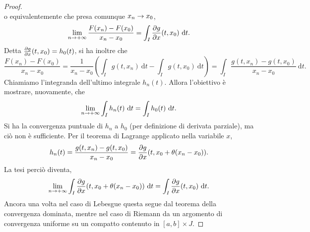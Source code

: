 \documentclass[Completo.tex]{subfiles}
\begin{document}
\begin{proof}
\begin{equation*}
\end{equation*}
o equivalentemente che presa comunque $x_n \rightarrow x_0$,
\begin{equation*}
\lim_{n \ra +\infty} \frac{F(x_n) - F(x_0)}{x_n-x_0} = \int_I \frac{\pd g}{\pd x}(t, x_0) \ \mathrm{d}t.
\end{equation*}
Detta $\frac{\partial g}{\partial x}(t, x_0) = h_0(t)$, si ha inoltre che
\begin{equation*}
\frac{F(x_n) - F(x_0)}{x_n-x_0} = \frac{1}{x_n-x_0} \left( \int_I g(t, x_n) \ \mathrm{d}t - \int_I g(t, x_0) \ \mathrm{d}t \right) = \int_I \frac{g(t, x_n) - g(t, x_0)}{x_n-x_0} \ \mathrm{d}t.
\end{equation*}
Chiamiamo l'integranda dell'ultimo integrale $h_n(t)$. Allora l'obiettivo è mostrare, nuovamente, che
\begin{equation*}
\lim_{n \rightarrow +\infty} \int_I h_n(t) \ \mathrm{d}t = \int_I h_0(t) \ \mathrm{d}t.
\end{equation*}
Si ha la convergenza puntuale di $h_n$ a $h_0$ (per definizione di derivata parziale), ma ciò non è sufficiente. Per il teorema di Lagrange applicato nella variabile $x$,
\begin{equation*}
h_n(t) = \frac{g(t, x_n) - g(t, x_0)}{x_n-x_0} = \frac{\partial g}{\partial x}(t, x_0 + \theta(x_n-x_0)).
\end{equation*}
La tesi perciò diventa,
\begin{equation*}
\lim_{n \ra +\infty} \int_I \frac{\pd g}{\pd x}(t, x_0 + \theta(x_n-x_0)) \ \mathrm{d}t = \int_I \frac{\pd g}{\pd x}(t, x_0) \ \mathrm{d}t.
\end{equation*}
Ancora una volta nel caso di Lebesgue questa segue dal teorema della convergenza dominata, mentre nel caso di Riemann da un argomento di convergenza uniforme su un compatto contenuto in $[a,b] \times J$.
\end{proof}
\end{document}
